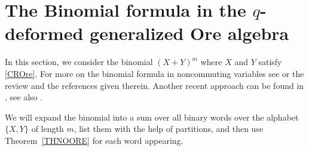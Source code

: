 \documentclass[10pt]{amsart}
\begin{document}
\section{The Binomial formula in the $q$-deformed generalized Ore algebra}\label{Binomial}

In this section, we consider the binomial $(X+Y)^m$ where $X$ and $Y$ satisfy \eqref{CROre}. For more on the binomial formula in noncommuting variables see \cite{TMMS2011} or the review \cite{MS2021} and the references given therein. Another recent approach can be found in \cite{HJYZ2023}, see also \cite{B2024}. 

We will expand the binomial into a sum over all binary words over the alphabet $\{X,Y\}$ of length $m$, list them with the help of partitions, and then use Theorem~\ref{THNOORE} for each word appearing. 
\end{document}
